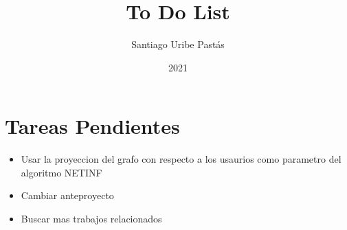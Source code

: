 \documentclass{article}
\title{To Do List}
\author{Santiago Uribe Pastás}
\date{2021}
\begin{document}
\maketitle

\section{Tareas Pendientes}
\begin{itemize}
    \item Usar la proyeccion del grafo con respecto a los usaurios como parametro del algoritmo NETINF
    \item Cambiar anteproyecto
    \item Buscar mas trabajos relacionados
\end{itemize}
\end{document}
